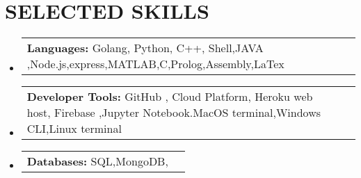 \documentclass[letterpaper,11pt]{article}
\makeatletter
\newcommand{\resumeItem}[1]{
  \item\small{
    {#1 \vspace{-2pt}}
  }
}
\newcommand{\resumeSubheading}[4]{
  \vspace{-2pt}\item
    \begin{tabular*}{\textwidth}[t]{l@{\extracolsep{\fill}}r}
      \normalsize\textbf{#1} & #2 \\
      \textit{\small#3} & \textit{\small #4} \\
    \end{tabular*}\vspace{-7pt}
}
\newcommand{\resumeProjectHeading}[2]{
    \item
    \begin{tabular*}{\textwidth}{l@{\extracolsep{\fill}}r}
      \small#1 & #2 \\
    \end{tabular*}\vspace{-7pt}
}
\newcommand{\resumeSubHeadingListStart}{\begin{itemize}[leftmargin=0in, label={}]}
\newcommand{\resumeSubHeadingListEnd}{\end{itemize}}
\newcommand{\resumeItemListStart}{\begin{itemize}[leftmargin=.4in, labelsep=.13in]}
\newcommand{\resumeItemListEnd}{\end{itemize}\vspace{-5pt}}
\makeatother
\begin{document}




%
\section{SELECTED SKILLS}
    \resumeSubHeadingListStart
      \resumeProjectHeading
          {\textbf{Languages:} Golang, Python, C\small{++}, Shell,JAVA ,Node.js,express,MATLAB,C,Prolog,Assembly,LaTex}{}
      \resumeProjectHeading
          {\textbf{Developer Tools:} GitHub , Cloud Platform, Heroku web host, Firebase ,Jupyter Notebook.MacOS terminal,Windows CLI,Linux terminal }{}
       \resumeProjectHeading
          {\textbf{Databases:} SQL,MongoDB, }{}
    \resumeSubHeadingListEnd

%
\end{document}
